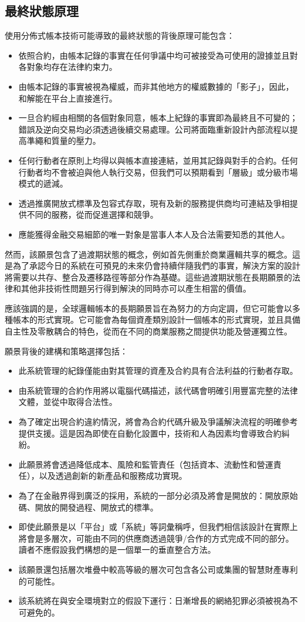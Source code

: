 ﻿\documentclass{article}
\begin{document}
\subsection{最終狀態原理}
使用分佈式帳本技術可能導致的最終狀態的背後原理可能包含：
\begin{itemize}
	\item 依照合約，由帳本記錄的事實在任何爭議中均可被接受為可使用的證據並且對各對象均存在法律約束力。
	\item 由帳本記錄的事實被視為權威，而非其他地方的權威數據的「影子」，因此，和解能在平台上直接進行。
	\item 一旦合約經由相關的各個對象同意，帳本上紀錄的事實即為最終且不可變的；錯誤及逆向交易均必須透過後續交易處理。公司將面臨重新設計內部流程以提高準繩和質量的壓力。
	\item 任何行動者在原則上均得以與帳本直接連結，並用其記錄與對手的合約。任何行動者均不會被迫與他人執行交易，但我們可以預期看到「層級」或分級市場模式的遞減。 
	\item 透過推廣開放式標準及包容式存取，現有及新的服務提供商均可連結及爭相提供不同的服務，從而促進選擇和競爭。
	\item 應能獲得金融交易細節的唯一對象是當事人本人及合法需要知悉的其他人。
\end{itemize}

然而，該願景包含了過渡期狀態的概念，例如首先側重於商業邏輯共享的概念。這是為了承認今日的系統在可預見的未來仍會持續伴隨我們的事實，解決方案的設計將需要以共存、整合及遷移路徑等部分作為基礎。這些過渡期狀態在長期願景的法律和其他非技術性問題另行得到解決的同時亦可以產生相當的價值。

應該強調的是，全球邏輯帳本的長期願景旨在為努力的方向定調，但它可能會以多種帳本的形式實現。它可能會為每個資產類別設計一個帳本的形式實現，並且具備自主性及零散耦合的特色，從而在不同的商業服務之間提供功能及營運獨立性。 

願景背後的建構和策略選擇包括：
\begin{itemize} 
\item 此系統管理的紀錄僅能由對其管理的資產及合約具有合法利益的行動者存取。
\item 由系統管理的合約作用將以電腦代碼描述，該代碼會明確引用豐富完整的法律文體，並從中取得合法性。\cite{Ricardian}
\item 為了確定出現合約違約情況，將會為合約代碼升級及爭議解決流程的明確參考提供支援。這是因為即使在自動化設置中，技術和人為因素均會導致合約糾紛。 
\item 此願景將會透過降低成本、風險和監管責任（包括資本、流動性和營運責任），以及透過創新的新產品和服務成功實現。
\item 為了在金融界得到廣泛的採用，系統的一部分必須及將會是開放的：開放原始碼、開放的開發過程、開放式的標準。
\item 即使此願景是以「平台」或「系統」等詞彙稱呼，但我們相信該設計在實際上將會是多層次，可能由不同的供應商透過競爭/合作的方式完成不同的部分。讀者不應假設我們構想的是一個單一的垂直整合方法。
\item 該願景還包括層次堆疊中較高等級的層次可包含各公司或集團的智慧財產專利的可能性。
\item 該系統將在與安全環境對立的假設下運行：日漸增長的網絡犯罪必須被視為不可避免的。
\end{itemize}
\end{document}
